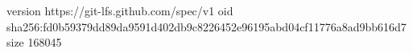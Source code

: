 version https://git-lfs.github.com/spec/v1
oid sha256:fd0b59379dd89da9591d402db9c8226452e96195abd04cf11776a8ad9bb616d7
size 168045
